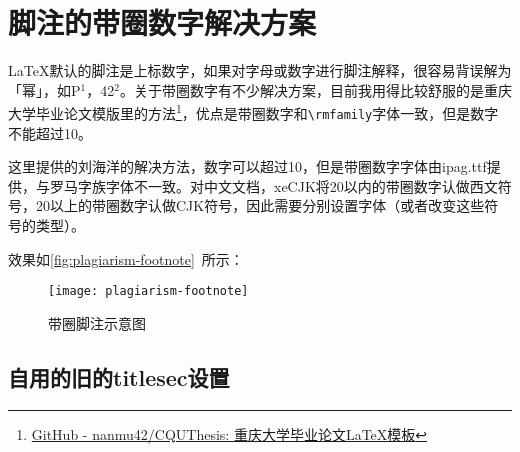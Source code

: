 \section{脚注的带圈数字解决方案}


\LaTeX{}默认的脚注是上标数字，如果对字母或数字进行脚注解释，很容易背误解为「幂」，如P$ ^1 $，42$ ^2 $。关于带圈数字有不少解决方案，目前我用得比较舒服的是重庆大学毕业论文模版里的方法\footnote{\href{https://github.com/nanmu42/CQUThesis}{GitHub - nanmu42/CQUThesis: 重庆大学毕业论文LaTeX模板}}，优点是带圈数字和\lstinline|\rmfamily|字体一致，但是数字不能超过10。

这里提供的刘海洋的解决方法，数字可以超过10，但是带圈数字字体由ipag.ttf提供，与罗马字族字体不一致。对中文文档，xeCJK将20以内的带圈数字认做西文符号，20以上的带圈数字认做CJK符号，因此需要分别设置字体（或者改变这些符号的类型）。

\begin{latex}
\usepackage{xunicode-addon}
\newfontfamily{} %
\newCJKfontfamily{} %
\renewcommand\thefootnote{{\fnmarkfont\fnCJKmarkfont\textcircled{\arabic{footnote}}}}
\end{latex}

效果如\autoref{fig:plagiarism-footnote}~所示：

\begin{figure}[!htbp]
    \centering
    \texttt{[image: plagiarism-footnote]}
    \caption{带圈脚注示意图}
    \label{fig:plagiarism-footnote}
\end{figure}

\subsection{自用的旧的titlesec设置}

